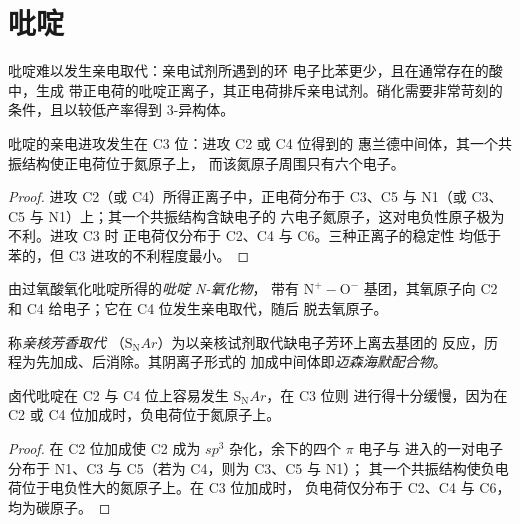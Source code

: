 \section{吡啶}

吡啶难以发生亲电取代：亲电试剂所遇到的环
电子比苯更少，且在通常存在的酸中，生成
带正电荷的吡啶正离子，其正电荷排斥亲电试剂。硝化需要非常苛刻的
条件，且以较低产率得到 3-异构体。

\begin{proposition}[C3 位上的亲电取代]\label{prop:b3:heterocycles:pyridine-c3}
吡啶的亲电进攻发生在 C3 位：进攻 C2 或 C4 位得到的
惠兰德中间体，其一个共振结构使正电荷位于氮原子上，
而该氮原子周围只有六个电子。
\end{proposition}

\begin{proof}
进攻 C2（或 C4）所得正离子中，正电荷分布于 C3、C5
与 N1（或 C3、C5 与 N1）上；其一个共振结构含缺电子的
六电子氮原子，这对电负性原子极为不利。进攻 C3 时
正电荷仅分布于 C2、C4 与 C6。三种正离子的稳定性
均低于苯的，但 C3 进攻的不利程度最小。
\end{proof}

\begin{definition}[吡啶 N-氧化物]\label{def:b3:heterocycles:n-oxide}
由过氧酸氧化吡啶所得的\emph{吡啶 N-氧化物}，
带有 $\mathrm{N^+{-}O^-}$ 基团，其氧原子向 C2
和 C4 给电子；它在 C4 位发生亲电取代，随后
脱去氧原子。
\end{definition}

\begin{definition}[亲核芳香取代]\label{def:b3:heterocycles:snar}
称\emph{亲核芳香取代}
（$\mathrm S_\mathrm NAr$）为以亲核试剂取代缺电子芳环上离去基团的
反应，历程为先加成、后消除。其阴离子形式的
加成中间体即\emph{迈森海默配合物}。
\end{definition}

\begin{proposition}\label{prop:b3:heterocycles:snar-positions}
卤代吡啶在 C2 与 C4 位上容易发生 $\mathrm S_\mathrm NAr$，在 C3 位则
进行得十分缓慢，因为在 C2 或 C4 位加成时，负电荷位于氮原子上。
\end{proposition}

\begin{proof}
在 C2 位加成使 C2 成为 $sp^3$ 杂化，余下的四个 $\pi$ 电子与
进入的一对电子分布于 N1、C3 与 C5（若为 C4，则为 C3、C5 与 N1）；
其一个共振结构使负电荷位于电负性大的氮原子上。在 C3 位加成时，
负电荷仅分布于 C2、C4 与 C6，均为碳原子。
\end{proof}

